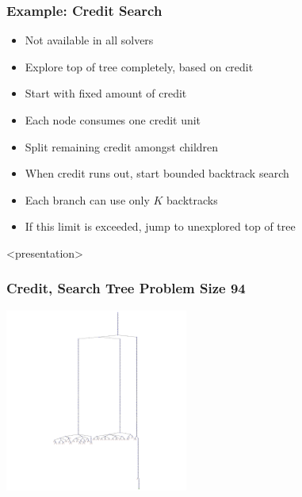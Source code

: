 \begin{frame}
\frametitle{Example: Credit Search}
\begin{itemize}
  \item Not available in all solvers
\item Explore top of tree completely, based on credit
\item Start with fixed amount of credit
\item Each node consumes one credit unit
\item Split remaining credit amongst children
\item When credit runs out, start bounded backtrack search
\item Each branch can use only $K$ backtracks
\item If this limit is exceeded, jump to unexplored top of tree
\end{itemize}
\end{frame}

\begin{frame}<presentation>
\frametitle{Credit, Search Tree Problem Size 94}
\includegraphics[width=6cm]{../nqueen/credit/tree_302}
\end{frame}

